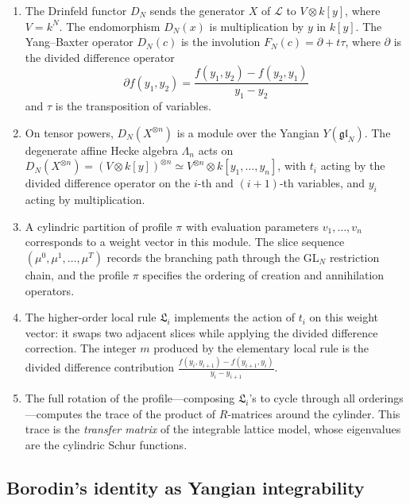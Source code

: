 \documentclass[12pt,a4paper]{article}
\theoremstyle{definition}
\theoremstyle{remark}
\newcommand{\gl}{\mathfrak{gl}}
\newcommand{\fL}{\mathfrak{L}}
\begin{document}
\begin{enumerate}
\item The Drinfeld functor $D_N$ sends the generator $X$ of
  $\mathcal{L}$ to $V \otimes k[y]$, where $V = k^N$. The
  endomorphism $D_N(x)$ is multiplication by $y$ in $k[y]$. The
  Yang--Baxter operator $D_N(c)$ is the involution
  $F_N(c) = \partial + t\tau$, where $\partial$ is the divided
  difference operator
  \[
    \partial f(y_1, y_2) = \frac{f(y_1, y_2) - f(y_2, y_1)}{y_1 - y_2}
  \]
  and $\tau$ is the transposition of variables.

\item On tensor powers, $D_N(X^{\otimes n})$ is a module over the
  Yangian $Y(\gl_N)$. The degenerate affine Hecke algebra $\Lambda_n$
  acts on $D_N(X^{\otimes n}) = (V \otimes k[y])^{\otimes n}
  \simeq V^{\otimes n} \otimes k[y_1, \ldots, y_n]$, with $t_i$
  acting by the divided difference operator on the $i$-th and
  $(i{+}1)$-th variables, and $y_i$ acting by multiplication.

\item A cylindric partition of profile $\pi$ with evaluation
  parameters $v_1, \ldots, v_n$ corresponds to a weight vector in this
  module. The slice sequence
  $(\mu^0, \mu^1, \ldots, \mu^T)$ records the branching path through
  the $\mathrm{GL}_N$ restriction chain, and the profile $\pi$
  specifies the ordering of creation and annihilation operators.

\item The higher-order local rule $\fL_i$ implements the action of
  $t_i$ on this weight vector: it swaps two adjacent slices while
  applying the divided difference correction. The integer $m$ produced
  by the elementary local rule is the divided difference contribution
  $\frac{f(y_i, y_{i+1}) - f(y_{i+1}, y_i)}{y_i - y_{i+1}}$.

\item The full rotation of the profile---composing $\fL_i$'s to cycle
  through all orderings---computes the trace of the product of
  $R$-matrices around the cylinder. This trace is the \emph{transfer
  matrix} of the integrable lattice model, whose eigenvalues are the
  cylindric Schur functions.
\end{enumerate}

\subsection{Borodin's identity as Yangian integrability}
\end{document}
